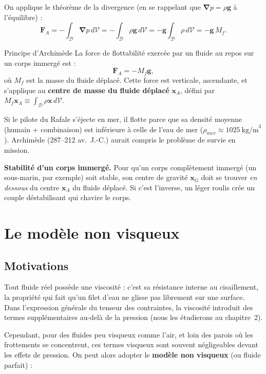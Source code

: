 \documentclass[11pt,a4paper]{report}
\begin{document}
On applique le théorème de la divergence (en se rappelant que
$\boldsymbol{\nabla}p = \rho\bm{g}$ à l'équilibre) :
\[
    \bm{F}_A = -\int_\mathcal{D} \boldsymbol{\nabla}p\,d\mathcal{V}
             = -\int_\mathcal{D} \rho\bm{g}\,d\mathcal{V}
             = -\bm{g}\int_\mathcal{D} \rho\,d\mathcal{V}
             = -\bm{g}\,M_f.
\]

\begin{importantbox}{Principe d'Archimède}
La force de flottabilité exercée par un fluide au repos sur un corps immergé est :
\[
    \bm{F}_A = -M_f\bm{g},
\]
où $M_f$ est la masse du fluide déplacé. Cette force est verticale, ascendante,
et s'applique au \textbf{centre de masse du fluide déplacé}
$\bm{x}_A$, défini par $M_f\bm{x}_A \equiv \int_\mathcal{D}\rho\bm{x}\,d\mathcal{V}$.
\end{importantbox}

Si le pilote du Rafale s'éjecte en mer, il flotte parce que sa densité moyenne
(humain + combinaison) est inférieure à celle de l'eau de mer
($\rho_{mer} \approx 1025~\text{kg/m}^3$). Archimède (287--212 av.~J.-C.) aurait
compris le problème de survie en mission.

\textbf{Stabilité d'un corps immergé.} Pour qu'un corps complètement immergé (un
sous-marin, par exemple) soit stable, son centre de gravité $\bm{x}_G$ doit se
trouver \textit{en dessous} du centre $\bm{x}_A$ du fluide déplacé. Si c'est
l'inverse, un léger roulis crée un couple déstabilisant qui chavire le corps.

\section{Le modèle non visqueux}

\subsection{Motivations}

Tout fluide réel possède une viscosité : c'est sa résistance interne au cisaillement,
la propriété qui fait qu'un filet d'eau ne glisse pas librement sur une surface. Dans
l'expression générale du tenseur des contraintes, la viscosité introduit des termes
supplémentaires au-delà de la pression (nous les étudierons au chapitre~2).

Cependant, pour des fluides peu visqueux comme l'air, et loin des parois où les
frottements se concentrent, ces termes visqueux sont souvent négligeables devant les
effets de pression. On peut alors adopter le \textbf{modèle non visqueux} (ou fluide
parfait) :
\end{document}
